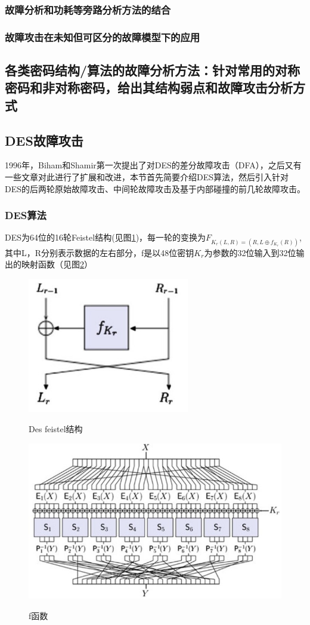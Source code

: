 \documentclass[a4paper,12pt]{article}
\begin{document}
\begin{CJK}{UTF8}{gkai}
\subsubsection{故障分析和功耗等旁路分析方法的结合}
\subsubsection{故障攻击在未知但可区分的故障模型下的应用}
\subsection{各类密码结构/算法的故障分析方法：针对常用的对称密码和非对称密码，给出其结构弱点和故障攻击分析方式}
\subsection{DES故障攻击}
1996年，Biham和Shamir第一次提出了对DES的差分故障攻击（DFA），之后又有一些文章对此进行了扩展和改进，本节首先简要介绍DES算法，然后引入针对DES的后两轮原始故障攻击、中间轮故障攻击及基于内部碰撞的前几轮故障攻击。
\subsubsection{DES算法}
DES为64位的16轮Feistel结构(见图\ref{des_feistel})，每一轮的变换为$F_{K_r(L,R)=(R,L \oplus f_{K_r}(R))}$,其中L，R分别表示数据的左右部分，f是以48位密钥$K_r$为参数的32位输入到32位输出的映射函数（见图\ref{des_f_function}）
\begin{figure}
\centering
\caption{Des feistel结构}
\includegraphics[width=200pt]{Feistel.jpg}
\label{des_feistel}
\end{figure}

\begin{figure}
\centering
\caption{f函数}
\includegraphics[width=400pt]{des_f_function.jpg}
\label{des_f_function}
\end{figure}



\end{CJK}
\end{document}
